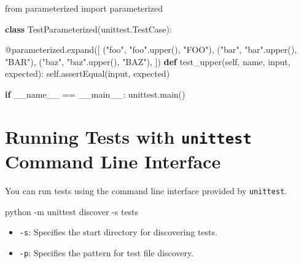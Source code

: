 \documentclass[
  letterpaper,
  DIV=11,
  numbers=noendperiod]{scrreprt}
\newenvironment{Shaded}{\begin{snugshade}}{\end{snugshade}}
\newcommand{\AttributeTok}[1]{\textcolor[rgb]{0.40,0.45,0.13}{#1}}
\newcommand{\BuiltInTok}[1]{\textcolor[rgb]{0.00,0.23,0.31}{#1}}
\newcommand{\ControlFlowTok}[1]{\textcolor[rgb]{0.00,0.23,0.31}{\textbf{#1}}}
\newcommand{\ExtensionTok}[1]{\textcolor[rgb]{0.00,0.23,0.31}{#1}}
\newcommand{\ImportTok}[1]{\textcolor[rgb]{0.00,0.46,0.62}{#1}}
\newcommand{\KeywordTok}[1]{\textcolor[rgb]{0.00,0.23,0.31}{\textbf{#1}}}
\newcommand{\NormalTok}[1]{\textcolor[rgb]{0.00,0.23,0.31}{#1}}
\newcommand{\OperatorTok}[1]{\textcolor[rgb]{0.37,0.37,0.37}{#1}}
\newcommand{\StringTok}[1]{\textcolor[rgb]{0.13,0.47,0.30}{#1}}
\newcommand{\VariableTok}[1]{\textcolor[rgb]{0.07,0.07,0.07}{#1}}
\providecommand{\tightlist}{%
  \setlength{\itemsep}{0pt}\setlength{\parskip}{0pt}}\usepackage{longtable,booktabs,array}
\begin{document}
\begin{Shaded}
\begin{Highlighting}[]
\ImportTok{from}\NormalTok{ parameterized }\ImportTok{import}\NormalTok{ parameterized}

\KeywordTok{class}\NormalTok{ TestParameterized(unittest.TestCase):}

    \AttributeTok{@parameterized.expand}\NormalTok{([}
\NormalTok{        (}\StringTok{"foo"}\NormalTok{, }\StringTok{"foo"}\NormalTok{.upper(), }\StringTok{"FOO"}\NormalTok{),}
\NormalTok{        (}\StringTok{"bar"}\NormalTok{, }\StringTok{"bar"}\NormalTok{.upper(), }\StringTok{"BAR"}\NormalTok{),}
\NormalTok{        (}\StringTok{"baz"}\NormalTok{, }\StringTok{"baz"}\NormalTok{.upper(), }\StringTok{"BAZ"}\NormalTok{),}
\NormalTok{    ])}
    \KeywordTok{def}\NormalTok{ test\_upper(}\VariableTok{self}\NormalTok{, name, }\BuiltInTok{input}\NormalTok{, expected):}
        \VariableTok{self}\NormalTok{.assertEqual(}\BuiltInTok{input}\NormalTok{, expected)}

\ControlFlowTok{if} \VariableTok{\_\_name\_\_} \OperatorTok{==} \StringTok{\textquotesingle{}\_\_main\_\_\textquotesingle{}}\NormalTok{:}
\NormalTok{    unittest.main()}
\end{Highlighting}
\end{Shaded}

\section{\texorpdfstring{Running Tests with \texttt{unittest} Command
Line
Interface}{Running Tests with unittest Command Line Interface}}\label{running-tests-with-unittest-command-line-interface}

You can run tests using the command line interface provided by
\texttt{unittest}.

\begin{Shaded}
\begin{Highlighting}[]
\ExtensionTok{python} \AttributeTok{{-}m}\NormalTok{ unittest discover }\AttributeTok{{-}s}\NormalTok{ tests}
\end{Highlighting}
\end{Shaded}

\begin{itemize}
\tightlist
\item
  \texttt{-s}: Specifies the start directory for discovering tests.
\item
  \texttt{-p}: Specifies the pattern for test file discovery.
\end{itemize}
\end{document}
